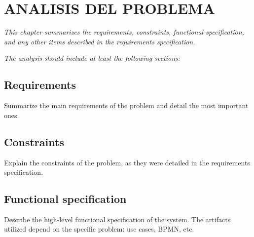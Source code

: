 \chapter{ANALISIS DEL PROBLEMA}

\textit{This chapter summarizes the requirements, constraints, functional specification, and any other items described in the requirements specification.}

\textit{The analysis should include at least the following sections:}

\section{Requirements}

Summarize the main requirements of the problem and detail the most important ones.

\section{Constraints}

Explain the constraints of the problem, as they were detailed in the requirements specification.

\section{Functional specification}

Describe the high-level functional specification of the system. The artifacts utilized depend on the specific problem: use cases, BPMN, etc.
